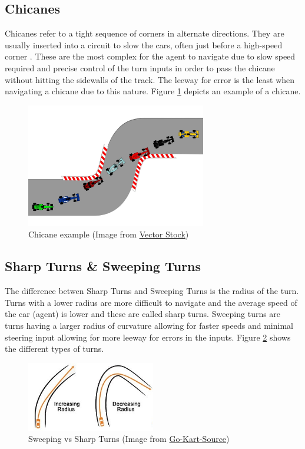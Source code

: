 \subsection{Chicanes}
Chicanes refer to a tight sequence of corners in alternate
directions. They are usually inserted into a circuit to slow the cars,
often just before a high-speed corner \cite{F1Chicane}. These are the
most complex for the agent to navigate due to slow speed required and
precise control of the turn inputs in order to pass the chicane
without hitting the sidewalls of the track. The leeway for error is
the least when navigating a chicane due to this nature. Figure
\ref{fig:chicane} depicts an example of a chicane.
\begin{figure}[H]
  \centering \includegraphics[width=0.7\textwidth]{images/Chicane.jpg}
  \caption{Chicane example (Image from
    \href{https://www.vectorstock.com/royalty-free-vector/chicane-road-circuit-vector-7128004}{Vector
      Stock})}
  \label{fig:chicane}
\end{figure}

\subsection{Sharp Turns \& Sweeping Turns}
The difference betwen Sharp Turns and Sweeping Turns is the radius of
the turn. Turns with a lower radius are more difficult to navigate and
the average speed of the car (agent) is lower and these are called
sharp turns. Sweeping turns are turns having a larger radius of
curvature allowing for faster speeds and minimal steering input
allowing for more leeway for errors in the inputs. Figure
\ref{fig:turns} shows the different types of turns.

\begin{figure}[H]
  \centering
  \includegraphics[width=0.5\textwidth]{images/Turn-Types-crop.jpg}
  \caption{Sweeping vs Sharp Turns (Image from
    \href{https://go-kart-source.com/go-kart-cornering/}{Go-Kart-Source})}
  \label{fig:turns}
\end{figure}

